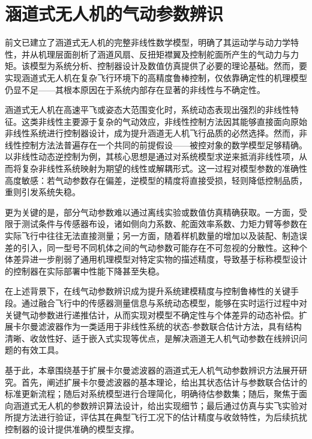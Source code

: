 
\chapter{涵道式无人机的气动参数辨识}
前文已建立了涵道式无人机的完整非线性数学模型，明确了其运动学与动力学特性，并从机理层面剖析了涵道风扇、反扭矩襟翼及控制舵面所产生的气动力与力矩。该模型为系统分析、控制器设计及数值仿真提供了必要的理论基础。然而，要实现涵道式无人机在复杂飞行环境下的高精度鲁棒控制，仅依靠确定性的机理模型仍显不足——其根本原因在于系统内部存在显著的非线性与不确定性。

涵道式无人机在高速平飞或姿态大范围变化时，系统动态表现出强烈的非线性特征。这类非线性主要源于复杂的气动效应，非线性控制方法因其能够直接面向原始非线性系统进行控制器设计，成为提升涵道无人机飞行品质的必然选择。然而，非线性控制方法法普遍存在一个共同的前提假设——被控对象的数学模型足够精确。以非线性动态逆控制为例，其核心思想是通过对系统模型求逆来抵消非线性项，从而将复杂非线性系统映射为期望的线性或解耦形式。这一过程对模型参数的准确性高度敏感：若气动参数存在偏差，逆模型的精度将直接受损，轻则降低控制品质，重则引发系统失稳。

更为关键的是，部分气动参数难以通过离线实验或数值仿真精确获取。一方面，受限于测试条件与传感器布设，诸如侧向力系数、舵面效率系数、力矩力臂等参数在实际飞行中往往无法直接测量；另一方面，随着样机数量的增加以及装配、制造误差的引入，同一型号不同机体之间的气动参数可能存在不可忽视的分散性。这种个体差异进一步削弱了通用机理模型对特定实物的描述精度，导致基于标称模型设计的控制器在实际部署中性能下降甚至失稳。

在上述背景下，在线气动参数辨识成为提升系统建模精度与控制鲁棒性的关键手段。通过融合飞行中的传感器测量信息与系统动态模型，能够在实时运行过程中对关键气动参数进行递推估计，从而实现对模型不确定性与个体差异的动态补偿。扩展卡尔曼滤波器作为一类适用于非线性系统的状态-参数联合估计方法，具有结构清晰、收敛性好、适于嵌入式实现等优点，是解决涵道无人机气动参数在线辨识问题的有效工具。

基于此，本章围绕基于扩展卡尔曼滤波器的涵道式无人机气动参数辨识方法展开研究。首先，阐述扩展卡尔曼滤波器的基本理论，给出其状态估计与参数联合估计的标准更新流程；随后对系统模型进行合理简化，明确待估参数集；随后，聚焦于面向涵道式无人机的参数辨识算法设计，给出实现细节；最后通过仿真与实飞实验对所提方法进行验证，评估其在典型飞行工况下的估计精度与收敛特性，为后续抗扰控制器的设计提供准确的模型支撑。


